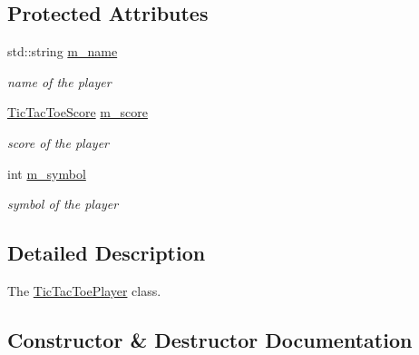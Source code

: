 \subsection*{Protected Attributes}
\begin{DoxyCompactItemize}
\item 
\mbox{\label{class_tic_tac_toe_player_ad2f56b8e5337362b6b0effc05fd7633e}} 
std\+::string \hyperlink{class_tic_tac_toe_player_ad2f56b8e5337362b6b0effc05fd7633e}{m\+\_\+name}
\begin{DoxyCompactList}\small\item\em name of the player \end{DoxyCompactList}\item 
\mbox{\label{class_tic_tac_toe_player_a931f1c29bf11a6dd32552ed8b8afcccc}} 
\hyperlink{class_tic_tac_toe_score}{Tic\+Tac\+Toe\+Score} \hyperlink{class_tic_tac_toe_player_a931f1c29bf11a6dd32552ed8b8afcccc}{m\+\_\+score}
\begin{DoxyCompactList}\small\item\em score of the player \end{DoxyCompactList}\item 
\mbox{\label{class_tic_tac_toe_player_abe8d693d11fc49191a8f664485875693}} 
int \hyperlink{class_tic_tac_toe_player_abe8d693d11fc49191a8f664485875693}{m\+\_\+symbol}
\begin{DoxyCompactList}\small\item\em symbol of the player \end{DoxyCompactList}\end{DoxyCompactItemize}


\subsection{Detailed Description}
The \hyperlink{class_tic_tac_toe_player}{Tic\+Tac\+Toe\+Player} class. 

\subsection{Constructor \& Destructor Documentation}
\mbox{\label{class_tic_tac_toe_player_a6ed50322b8f71dfb0f6ce067d33ff376}} 
